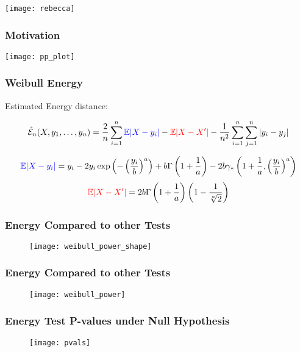 \documentclass[presentation]{beamer}
\newenvironment{Figure}
{\par\medskip\noindent\minipage{\linewidth}}
{\endminipage\par\medskip}
\begin{document}
\begin{frame}
  \texttt{[image: rebecca]}
\end{frame}

\begin{frame}
  \frametitle{Motivation}
  \begin{Figure}
    \centering
    \texttt{[image: pp\_plot]}
  \end{Figure}
\end{frame}

\begin{frame}
  \frametitle{Weibull Energy}
  \begin{block}{Estimated Energy distance:}
    \begin{center}
      $$\hat{\mathcal{E}}_n(X, y_1, \ldots, y_n) = \frac{2}{n} \sum_{i=1}^n \textcolor{blue}{\mathbb{E}|X - y_i|}  - \textcolor{red}{\mathbb{E}|X - X'|}  - \frac{1}{n^2} \sum_{i=1}^n \sum_{j=1}^n |y_i - y_j|$$
    \end{center}
  \end{block}  
  \begin{displaymath}
    \textcolor{blue}{\mathbb{E}|X-y_i|} = y_i - 2y_i \exp\left( - \left(\frac{y_i}{b}\right)^a \right) + b
    \Gamma \left(1 + \frac{1}{a}\right) -2b \gamma_{*} \left(1 + \frac{1}{a}, \left( \frac{y_i}{b} \right)^a\right)
  \end{displaymath}
  \vskip 0.5in
  \begin{displaymath}
    \textcolor{red}{\mathbb{E}|X - X'|} = 2b\Gamma \left( 1 + \frac{1}{a} \right)
    \left( 1 - \frac{1}{\sqrt[a]{2}} \right)
  \end{displaymath}
\end{frame}

\begin{frame}
  \frametitle{Energy Compared to other Tests}
  \begin{figure}
    \centering
    \texttt{[image: weibull\_power\_shape]}
  \end{figure}
\end{frame}

\begin{frame}
  \frametitle{Energy Compared to other Tests}
  \begin{figure}
    \centering
    \texttt{[image: weibull\_power]}
  \end{figure}
\end{frame}

\begin{frame}
  \frametitle{Energy Test P-values under Null Hypothesis}
  \begin{figure}
    \centering
    \texttt{[image: pvals]}
  \end{figure}
\end{frame}
\end{document}
